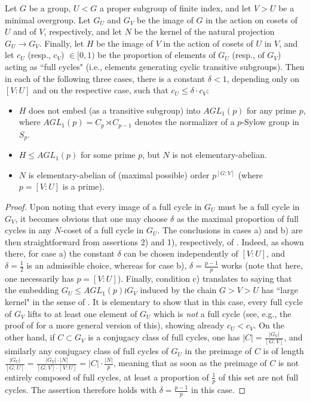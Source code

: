\documentclass[a4paper]{amsart}
\begin{document}
  \begin{proposition}
  \label{prop:stabpr_gp}
  Let $G$ be a group, $U<G$ a proper subgroup of finite index, and let $V>U$ be a minimal overgroup. Let $G_U$ and $G_V$ be the image of $G$ in the action on cosets of $U$ and of $V$,  respectively, and let $N$ be the kernel of the natural projection $G_U\to G_V$. Finally, let $H$ be the image of $V$ in the action of cosets of $U$ in $V$, and let $c_U$ (resp., $c_V$) $\in [0,1)$ be the proportion of elements of $G_U$ (resp., of $G_V$) acting as ``full cycles" (i.e., elements generating cyclic transitive subgroups). Then in each of the following three cases, there is a constant $\delta<1$, depending only on $[V:U]$ and on the respective case, such that $c_U \le \delta \cdot c_V$:
  \begin{itemize}
  \item[a)] $H$ does not embed (as a transitive subgroup) into $AGL_1(p)$ for any prime $p$, where $AGL_1(p)=C_p\rtimes C_{p-1}$ denotes the normalizer of a $p$-Sylow group in $S_p$.
  \item[b)] $H\le AGL_1(p)$ for some prime $p$, but $N$ is not elementary-abelian.
  \item[c)] $N$ is elementary-abelian of (maximal possible) order $p^{[G:V]}$ (where $p=[V:U]$ is a prime).
  \end{itemize}
  \end{proposition}
  \begin{proof}
  Upon noting that every image of a full cycle in $G_U$ must be a full cycle in $G_V$, it becomes obvious that one may choose $\delta$ as the maximal proportion of full cycles in any $N$-coset of a full cycle in $G_U$. The conclusions in cases a) and b) are then straightforward from assertions 2) and 1), respectively, of \cite[Proposition 3.2]{Koe24}. Indeed, as shown there, for case a) the constant $\delta$ can be chosen independently of $[V:U]$, and $\delta=\frac{1}{2}$ is an admissible choice, whereas for case b), $\delta = \frac{p-1}{p}$ works (note that here, one necessarily has $p=[V:U]$).  Finally, condition c) translates to saying that the embedding $G_U\le AGL_1(p)\wr G_V$ induced by the chain $G>V>U$ has ``large kernel" in the sense of \cite[\S 2.3]{KNR}. It is elementary to show that in this case, every full cycle of $G_V$ lifts to at least one element of $G_U$ which is {\it not} a full cycle (see, e.g., the proof of \cite[Proposition 5.1]{KNR} for a more general version of this), showing already $c_U<c_V$. On the other hand, if $C\subset G_V$ is a conjugacy class of full cycles, one has $|C|=\frac{|G_V|}{[G:V]}$, and similarly any conjugacy class of full cycles of $G_U$ in the preimage of $C$ is of length $\frac{|G_U|}{[G:U]} = \frac{|G_V|\cdot |N|}{[G:V]\cdot [V:U]}=|C|\cdot \frac{|N|}{p}$, meaning that as soon as the preimage of $C$ is not entirely composed of full cycles, at least a proportion of $\frac{1}{p}$ of this set are not full cycles. The assertion therefore holds with $\delta = \frac{p-1}{p}$ in this case.  
  \end{proof}
 
\end{document}
